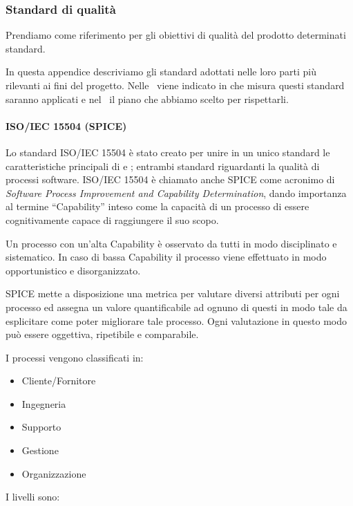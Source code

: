 \newpage

\subsubsection{Standard di qualità}	\label{standard di qualità}
Prendiamo come riferimento per gli obiettivi di qualità del prodotto determinati standard.


In questa appendice descriviamo gli standard adottati nelle loro parti più rilevanti ai fini del progetto. Nelle \NdPd\ viene indicato in che misura questi standard saranno applicati e nel \PdQd\ il piano che abbiamo scelto per rispettarli.

	\paragraph{ISO/IEC 15504 (SPICE)}\label{iso15504}
	Lo standard ISO/IEC 15504 è stato creato per unire in un unico standard le caratteristiche principali di  e ; entrambi standard riguardanti la qualità di processi software.
	ISO/IEC 15504 è chiamato anche SPICE come acronimo di \textit{Software Process Improvement and Capability Determination}, dando importanza al termine ``Capability'' inteso come la capacità di un processo di essere cognitivamente capace di raggiungere il suo scopo.

	Un processo con un'alta Capability è osservato da tutti in modo disciplinato e sistematico.
	In caso di bassa Capability il processo viene effettuato in modo opportunistico e disorganizzato.

	SPICE mette a disposizione una metrica per valutare diversi attributi per ogni processo ed assegna un valore quantificabile
	ad ognuno di questi in modo tale da esplicitare come poter migliorare tale processo. Ogni valutazione in questo modo può essere oggettiva, ripetibile e comparabile.

	I processi vengono classificati in:

	\begin{itemize}
		\item Cliente/Fornitore
		\item Ingegneria
		\item Supporto
		\item Gestione
		\item Organizzazione
	\end{itemize}

	I livelli sono:

